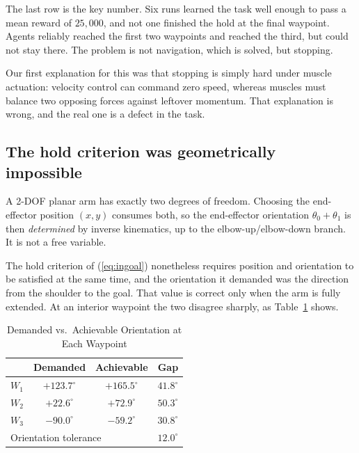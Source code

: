 \documentclass[conference]{IEEEtran}
\begin{document}
The last row is the key number. Six runs learned the task well enough to pass a
mean reward of $25{,}000$, and not one finished the hold at the final waypoint.
Agents reliably reached the first two waypoints and reached the third, but
could not stay there. The problem is not navigation, which is solved, but
stopping.

Our first explanation for this was that stopping is simply hard under muscle
actuation: velocity control can command zero speed, whereas muscles must
balance two opposing forces against leftover momentum. That explanation is
wrong, and the real one is a defect in the task.

\subsection{The hold criterion was geometrically impossible}
\label{sec:infeasible}

A 2-DOF planar arm has exactly two degrees of freedom. Choosing the
end-effector position $(x,y)$ consumes both, so the end-effector orientation
$\theta_0 + \theta_1$ is then \emph{determined} by inverse kinematics, up to
the elbow-up/elbow-down branch. It is not a free variable.

The hold criterion of (\ref{eq:ingoal}) nonetheless requires position and
orientation to be satisfied at the same time, and the orientation it demanded
was the direction from the shoulder to the goal. That value is correct only
when the arm is fully extended. At an interior waypoint the two disagree
sharply, as Table~\ref{tab:infeasible} shows.

\begin{table}[htbp]
\caption{Demanded vs.\ Achievable Orientation at Each Waypoint}
\begin{center}
\setlength{\tabcolsep}{4pt}
\begin{tabular}{lccc}
\toprule
& \textbf{Demanded} & \textbf{Achievable} & \textbf{Gap} \\
\midrule
$W_1$ & $+123.7^{\circ}$ & $+165.5^{\circ}$ & $41.8^{\circ}$ \\
$W_2$ & $+22.6^{\circ}$  & $+72.9^{\circ}$  & $50.3^{\circ}$ \\
$W_3$ & $-90.0^{\circ}$  & $-59.2^{\circ}$  & $30.8^{\circ}$ \\
\midrule
\multicolumn{3}{l}{Orientation tolerance} & $12.0^{\circ}$ \\
\bottomrule
\end{tabular}
\label{tab:infeasible}
\end{center}
\end{table}
\end{document}
